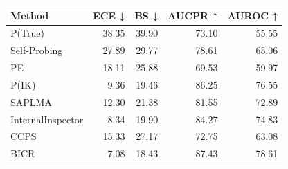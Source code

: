 \begin{tabular}{lrrrr}
\toprule
Method & ECE ↓ & BS ↓ & AUCPR ↑ & AUROC ↑ \\
\midrule
P(True) & 38.35 & 39.90 & 73.10 & 55.55 \\
Self-Probing & 27.89 & 29.77 & 78.61 & 65.06 \\
PE & 18.11 & 25.88 & 69.53 & 59.97 \\
P(IK) & 9.36 & 19.46 & 86.25 & 76.55 \\
SAPLMA & 12.30 & 21.38 & 81.55 & 72.89 \\
InternalInspector & 8.34 & 19.90 & 84.27 & 74.83 \\
CCPS & 15.33 & 27.17 & 72.75 & 63.08 \\
BICR & 7.08 & 18.43 & 87.43 & 78.61 \\
\bottomrule
\end{tabular}
